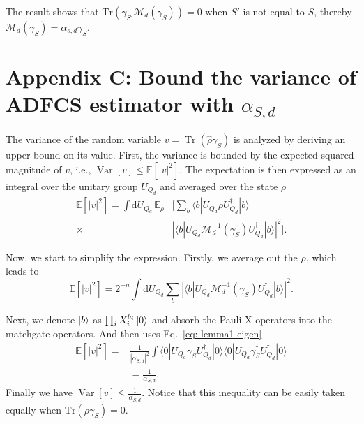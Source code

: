 \documentclass[journal=jctcce,a4paper,manuscript=article]{achemso}
\newcommand{\tra}[1]{\text{Tr}\left( #1 \right)}
\newcommand{\Var}{\mathop{\mathrm{Var}}}
\begin{document}
The result shows that $\tra{\gamma_{S'} \mathcal{M}_d(\gamma_S)} = 0$ when $S'$
is not equal to $ S$, thereby $\mathcal{M}_d (\gamma_S) = \alpha_{s,d}
  \gamma_S$.

\section{Appendix C: Bound the variance of ADFCS estimator with $\alpha_{S,d}$}
\label{appendix: bound variance}

The variance of the random variable $ v = \operatorname{Tr}(\hat{\rho}
  \gamma_S) $ is analyzed by deriving an upper bound on its value. First, the
variance is bounded by the expected squared magnitude of $ v $, i.e., $ \Var[v]
  \leq \mathbb{E}[|v|^2] $. The expectation is then expressed as an integral over
the unitary group $ U_{Q_d} $ and averaged over the state $ \rho $
\begin{equation}
  \begin{aligned}
    \mathbb{E}[|v|^2] = \int \mathrm{d}U_{Q_d} \, \mathbb{E}_{\rho} & \Big[\sum_b \langle b|U_{Q_d} \rho U_{Q_d}^\dagger|b \rangle                                  \\
    \times                                                          & \left|\langle b|U_{Q_d} \mathcal{M}_d^{-1}(\gamma_S) U_{Q_d}^\dagger|b \rangle\right|^2\Big].
  \end{aligned}
\end{equation}

Now, we start to simplify the expression. Firstly, we average out the $\rho$,
which leads to
\begin{equation}
  \mathbb{E}[|v|^2] = 2^{-n} \int \mathrm{d}U_{Q_d} \sum_b \left|\langle b|U_{Q_d} \mathcal{M}_d^{-1}(\gamma_S) U_{Q_d}^\dagger|b \rangle\right|^2.
\end{equation}

Next, we denote $\ket{b}$ as $\prod_i X_i^{b_i}\ket{0}$ and absorb the Pauli X
operators into the matchgate operators. And then uses Eq.~\eqref{eq: lemma1
  eigen}
\begin{align}
  \mathbb{E}[|v|^2] = & \frac{1}{|\alpha_{S,d}|^2} \int \langle 0|U_{Q_d} \gamma_S U_{Q_d}^\dagger|0 \rangle \langle 0|U_{Q_d} \gamma_S^\dagger U_{Q_d}^\dagger|0 \rangle \\
                      & =\frac{1}{\alpha_{S,d}}.
\end{align}
Finally we have $\Var[v] \leq \frac{1}{\alpha_{S,d}}$.
Notice that this inequality can be easily taken equally when $\tra{\rho \gamma_S} = 0$.
\end{document}
